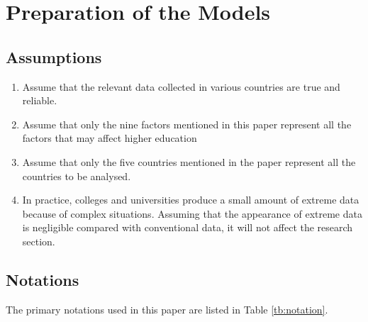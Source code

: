 \documentclass[12pt]{article}  %
\begin{document}
\section{Preparation of the Models}
\subsection{Assumptions}
\begin{enumerate}[\bfseries 1.]

\item Assume that the relevant data collected in various countries are true and reliable.

\item Assume that only the nine factors mentioned in this paper represent all the factors that may affect higher education

\item Assume that only the five countries mentioned in the paper represent all the countries to be analysed.

\item In practice, colleges and universities produce a small amount of extreme data because of complex situations. Assuming that the appearance of extreme data is negligible compared with conventional data, it will not affect the research section.

\end{enumerate}

\subsection{Notations}
The primary notations used in this paper are listed in Table \ref{tb:notation}.
\end{document}
